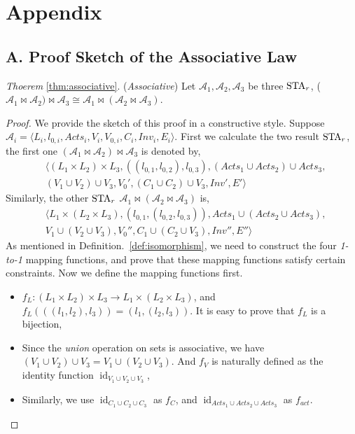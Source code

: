 \clearpage
\section*{Appendix}
\subsection*{A. Proof Sketch of the Associative Law}

\noindent\emph{Thoerem} \ref{thm:associative}. (\emph{Associative})
Let $\mathscr{A}_1, \mathscr{A}_2, \mathscr{A}_3$ be three $\mbox{STA}_r$, ($\mathscr{A}_{1}\bowtie \mathscr{A}_{2})\bowtie \mathscr{A}_{3}\cong\mathscr{A}_{1}\bowtie(\mathscr{A}_{2}\bowtie \mathscr{A}_{3})$.

\begin{proof}
We provide the sketch of this proof in a constructive style. Suppose $\mathscr{A}_i=\langle L_{i}, l_{0,i}, Acts_{i}, V_{i}, V_{0,i}, C_{i}, Inv_{i}, E_{i}\rangle$. First we calculate the two result $\mbox{STA}_r$, the first one $(\mathscr{A}_{1}\bowtie \mathscr{A}_{2})\bowtie \mathscr{A}_{3}$ is denoted by,
\begin{eqnarray*}
    & \langle
        (L_1\times L_2)\times L_3, ((l_{0,1}, l_{0,2}), l_{0,3}),
        (Acts_1\cup Acts_2)\cup Acts_3, \\
        & (V_1\cup V_2)\cup V_3,
        V_0',
        (C_1\cup C_2)\cup V_3,
        Inv', E'
    \rangle
\end{eqnarray*}
Similarly, the other $\mbox{STA}_r$ $\mathscr{A}_{1}\bowtie(\mathscr{A}_{2}\bowtie \mathscr{A}_{3})$ is,
\begin{eqnarray*}
    & \langle
        L_1\times (L_2\times L_3), (l_{0,1}, (l_{0,2}, l_{0,3})),
        Acts_1\cup(Acts_2\cup Acts_3), \\
        & V_1\cup(V_2\cup V_3),
        V_0'',
        C_1\cup (C_2\cup V_3),
        Inv'', E''
    \rangle
\end{eqnarray*}
As mentioned in Definition.~\ref{def:isomorphism}, we need to construct the four \emph{1-to-1} mapping functions, and prove that these mapping functions satisfy certain constraints. Now we define the mapping functions first.

\begin{itemize}
    \item $f_L:(L_1\times L_2)\times L_3\rightarrow L_1\times (L_2\times L_3)$, and $f_L(((l_1,l_2), l_3))=(l_1,(l_2,l_3))$. It is easy to prove that $f_L$ is a bijection,
    \item Since the \emph{union} operation on sets is associative, we have $(V_1\cup V_2)\cup V_3=V_1\cup(V_2\cup V_3)$. And $f_V$ is naturally defined as the identity function $\operatorname{id}_{V_1\cup V_2\cup V_3}$,
    \item Similarly, we use $\operatorname{id}_{C_1\cup C_2\cup C_3}$ as $f_C$, and $\operatorname{id}_{Acts_1\cup Acts_2\cup Acts_3}$ as $f_{act}$.
\end{itemize}


\end{proof}
